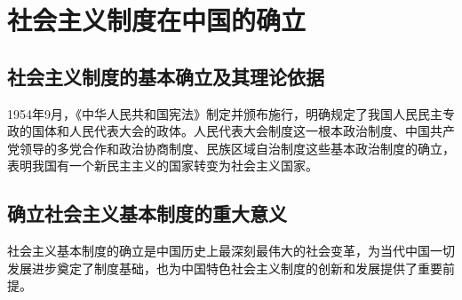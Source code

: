 \section{社会主义制度在中国的确立}

    \subsection{社会主义制度的基本确立及其理论依据}

    1954年9月，《中华人民共和国宪法》制定并颁布施行，明确规定了我国人民民主专政的国体和人民代表大会的政体。人民代表大会制度这一根本政治制度、中国共产党领导的多党合作和政治协商制度、民族区域自治制度这些基本政治制度的确立，表明我国有一个新民主主义的国家转变为社会主义国家。

    \subsection{确立社会主义基本制度的重大意义}
    社会主义基本制度的确立是中国历史上最深刻最伟大的社会变革，为当代中国一切发展进步奠定了制度基础，也为中国特色社会主义制度的创新和发展提供了重要前提。